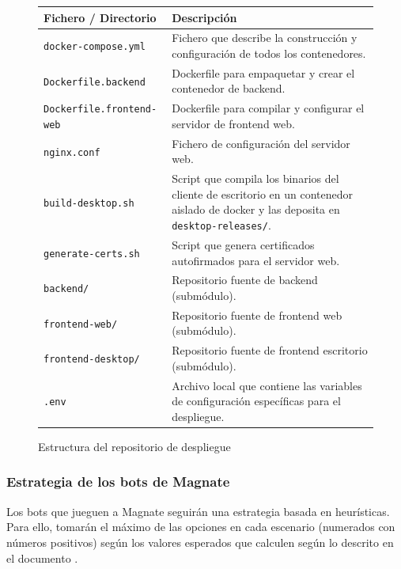 \documentclass[11pt]{article}
\begin{document}
\begin{figure}[h]
\begin{tabularx}{\textwidth}{@{} l X @{}}
\toprule
\textbf{Fichero / Directorio} & \textbf{Descripción} \\
\midrule
\texttt{docker-compose.yml}      & Fichero que describe la construcción y configuración de todos los contenedores. \\
\addlinespace
\texttt{Dockerfile.backend}      & Dockerfile para empaquetar y crear el contenedor de backend. \\
\addlinespace
\texttt{Dockerfile.frontend-web} & Dockerfile para compilar y configurar el servidor de frontend web. \\
\addlinespace
\texttt{nginx.conf}              & Fichero de configuración del servidor web. \\
\addlinespace
\texttt{build-desktop.sh}        & Script que compila los binarios del cliente de escritorio en un contenedor aislado de docker y las deposita en \texttt{desktop-releases/}. \\
\addlinespace
\texttt{generate-certs.sh}       & Script que genera certificados autofirmados para el servidor web. \\
\addlinespace
\texttt{backend/}                & Repositorio fuente de backend (submódulo). \\
\addlinespace
\texttt{frontend-web/}           & Repositorio fuente de frontend web (submódulo). \\
\addlinespace
\texttt{frontend-desktop/}       & Repositorio fuente de frontend escritorio (submódulo). \\
\addlinespace
\texttt{.env}                    & Archivo local que contiene las variables de configuración específicas para el despliegue. \\
\bottomrule
\end{tabularx}
    \caption{Estructura del repositorio de despliegue}
		\label{tab:deploy}
\end{figure}


\newpage

\subsubsection{Estrategia de los bots de Magnate} 
\label{sec:heuristica}
Los bots que jueguen a Magnate seguirán una estrategia basada en heurísticas. 
Para ello, tomarán el máximo de las opciones en cada escenario 
(numerados con números positivos) según los valores
esperados que calculen según lo descrito en el documento \cite{agent_heuristics}. 
\end{document}
